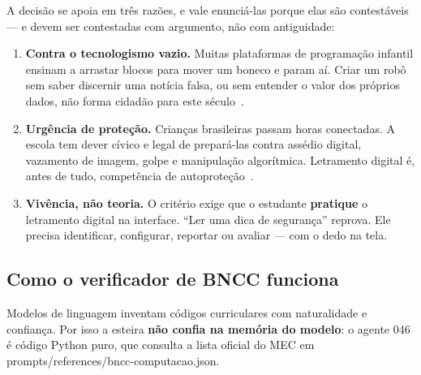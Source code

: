 \documentclass[11pt,a4paper]{article}
\newcommand{\cod}[1]{{\ttfamily\small #1}}
\begin{document}
A decisão se apoia em três razões, e vale enunciá-las porque elas são contestáveis --- e devem ser contestadas com argumento, não com antiguidade:

\begin{enumerate}
  \item \textbf{Contra o tecnologismo vazio.} Muitas plataformas de programação infantil ensinam a arrastar blocos para mover um boneco e param aí. Criar um robô sem saber discernir uma notícia falsa, ou sem entender o valor dos próprios dados, não forma cidadão para este século~\cite{buckingham2007,unesco2018}.
  \item \textbf{Urgência de proteção.} Crianças brasileiras passam horas conectadas. A escola tem dever cívico e legal de prepará-las contra assédio digital, vazamento de imagem, golpe e manipulação algorítmica. Letramento digital é, antes de tudo, competência de autoproteção~\cite{livingstone2017}.
  \item \textbf{Vivência, não teoria.} O critério exige que o estudante \textbf{pratique} o letramento digital na interface. ``Ler uma dica de segurança'' reprova. Ele precisa identificar, configurar, reportar ou avaliar --- com o dedo na tela.
\end{enumerate}

\subsection{Como o verificador de BNCC funciona}

Modelos de linguagem inventam códigos curriculares com naturalidade e confiança. Por isso a esteira \textbf{não confia na memória do modelo}: o agente 046 é código Python puro, que consulta a lista oficial do MEC em \cod{prompts/references/bncc-computacao.json}.

\begin{center}
\end{center}
\end{document}

